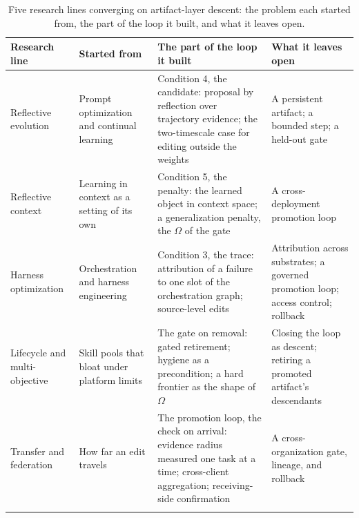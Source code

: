 \documentclass[
  11pt,
]{article}
\begin{document}
\begin{table}[htbp]
\caption{Five research lines converging on artifact-layer descent: the problem each started from, the part of the loop it built, and what it leaves open.}\label{tab:VIII-1}
\centering\small
\begin{tabular}{@{}
  >{\raggedright\arraybackslash}p{}
  >{\raggedright\arraybackslash}p{}
  >{\raggedright\arraybackslash}p{}
  >{\raggedright\arraybackslash}p{}@{}}
\toprule\noalign{}
\begin{minipage}[b]{\linewidth}\raggedright
Research line
\end{minipage} & \begin{minipage}[b]{\linewidth}\raggedright
Started from
\end{minipage} & \begin{minipage}[b]{\linewidth}\raggedright
The part of the loop it built
\end{minipage} & \begin{minipage}[b]{\linewidth}\raggedright
What it leaves open
\end{minipage} \\
\midrule\noalign{}


Reflective evolution & Prompt optimization and continual learning & Condition 4, the candidate: proposal by reflection over trajectory evidence; the two-timescale case for editing outside the weights & A persistent artifact; a bounded step; a held-out gate \\ \addlinespace[2.5pt]
Reflective context & Learning in context as a setting of its own & Condition 5, the penalty: the learned object in context space; a generalization penalty, the \(\Omega\) of the gate & A cross-deployment promotion loop \\ \addlinespace[2.5pt]
Harness optimization & Orchestration and harness engineering & Condition 3, the trace: attribution of a failure to one slot of the orchestration graph; source-level edits & Attribution across substrates; a governed promotion loop; access control; rollback \\ \addlinespace[2.5pt]
Lifecycle and multi-objective & Skill pools that bloat under platform limits & The gate on removal: gated retirement; hygiene as a precondition; a hard frontier as the shape of \(\Omega\) & Closing the loop as descent; retiring a promoted artifact's descendants \\ \addlinespace[2.5pt]
Transfer and federation & How far an edit travels & The promotion loop, the check on arrival: evidence radius measured one task at a time; cross-client aggregation; receiving-side confirmation & A cross-organization gate, lineage, and rollback \\ \addlinespace[2.5pt]
\bottomrule\noalign{}
\end{tabular}
\end{table}
\end{document}
